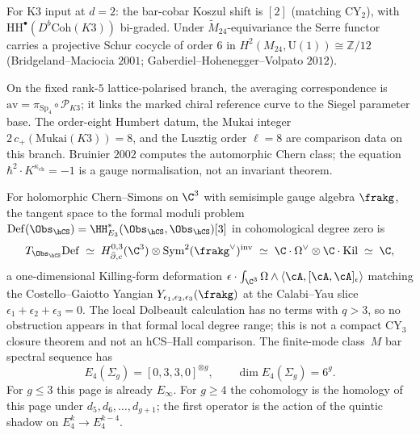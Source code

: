 \begin{remark}
\label{rem:en-fact-cy2-shift}
For K3 input at $d=2$: the bar-cobar Koszul shift is $[2]$ (matching $\mathrm{CY}_2$), with $\mathrm{HH}^\bullet(D^b\mathrm{Coh}(K3))$ bi-graded. Under $\widetilde{M}_{24}$-equivariance the Serre functor carries a projective Schur cocycle of order $6$ in $H^2(M_{24},\mathrm{U}(1))\cong\mathbb{Z}/12$ (Bridgeland--Maciocia $2001$; Gaberdiel--Hohenegger--Volpato $2012$).
\end{remark}

\begin{remark}
\label{rem:en-fact-averaging}
On the fixed rank-\(5\) lattice-polarised branch, the averaging correspondence is $\mathrm{av}=\pi_{\mathrm{Sp}_4}\circ\mathscr P_{K3}$; it links the marked chiral reference curve to the Siegel parameter base. The order-eight Humbert datum, the Mukai integer \(2\,c_+(\mathrm{Mukai}(K3))=8\), and the Lusztig order \(\ell=8\) are comparison data on this branch. Bruinier \(2002\) computes the automorphic Chern class; the equation \(\hbar^2\cdot K^{\kappa_{\mathrm{ch}}}=-1\) is a gauge normalisation, not an invariant theorem.
\end{remark}

\begin{conjecture}
\label{conj:first-order-moduli-6g-class-m}
\ClaimStatusConjectured
For holomorphic Chern--Simons on $\C^3$ with semisimple gauge algebra $\frakg$, the tangent space to the formal moduli problem $\mathrm{Def}(\Obs_{\hCS}) = \HH^\ast_{E_3}(\Obs_{\hCS}, \Obs_{\hCS})[3]$ in cohomological degree zero is
\[
 T_{\Obs_{\hCS}}\mathrm{Def} \;\simeq\; H^{0, 3}_{\bar\partial, c}(\C^3) \otimes \mathrm{Sym}^2(\frakg^\vee)^{\mathrm{inv}} \;\simeq\; \C \cdot \Omega^\vee \otimes \C \cdot \mathrm{Kil} \;\simeq\; \C,
\]
a one-dimensional Killing-form deformation $\epsilon \cdot \int_{\C^3} \Omega \wedge \langle \cA, [\cA, \cA]_\epsilon \rangle$ matching the Costello--Gaiotto Yangian $Y_{\epsilon_1, \epsilon_2, \epsilon_3}(\frakg)$ at the Calabi--Yau slice $\epsilon_1 + \epsilon_2 + \epsilon_3 = 0$. The local Dolbeault calculation has no terms with \(q>3\), so no obstruction appears in that formal local degree range; this is not a compact CY$_3$ closure theorem and not an hCS--Hall comparison. The finite-mode class~$M$ bar spectral sequence has
\[
 E_4(\Sigma_g)=[0,3,3,0]^{\otimes g},
 \qquad
 \dim E_4(\Sigma_g)=6^g .
\]
For \(g\leq3\) this page is already \(E_\infty\). For \(g\geq4\) the cohomology is the homology of this page under \(d_5,d_6,\ldots,d_{g+1}\); the first operator is the action of the quintic shadow on \(E_4^k\to E_4^{k-4}\).
\end{conjecture}

